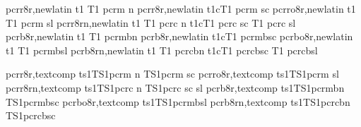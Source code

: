 

  {}
 {}
  {}
 {}

 {}
 {}

\installfonts
{}
  {pcrr8r,newlatin}  {t1} {T1} {pcr}{m} {n} {}
 {pcrr8r,newlatin}  {t1c}{T1} {pcr}{m} {sc}{}
 {pcrro8r,newlatin} {t1} {T1} {pcr}{m} {sl}{}
 {pcrr8rn,newlatin} {t1} {T1} {pcr}{c} {n} {}
 {t1c}{T1} {pcr}{c} {sc}{}
 {T1} {pcr}{c} {sl}{}
  {pcrb8r,newlatin}  {t1} {T1} {pcr}{mb}{n} {}
 {pcrb8r,newlatin}  {t1c}{T1} {pcr}{mb}{sc}{}
 {pcrbo8r,newlatin} {t1} {T1} {pcr}{mb}{sl}{}
 {pcrb8rn,newlatin} {t1} {T1} {pcr}{cb}{n} {}
 {t1c}{T1} {pcr}{cb}{sc}{}
 {T1} {pcr}{cb}{sl}{}
\endinstallfonts

\installfonts
{}
  {pcrr8r,textcomp}  {ts1}{TS1}{pcr}{m} {n} {}
                          {TS1}{pcr}{m} {sc}{}
 {pcrro8r,textcomp} {ts1}{TS1}{pcr}{m} {sl}{}
 {pcrr8rn,textcomp} {ts1}{TS1}{pcr}{c} {n} {}
                         {TS1}{pcr}{c} {sc}{}
 {sl}{}
  {pcrb8r,textcomp}  {ts1}{TS1}{pcr}{mb}{n} {}
                          {TS1}{pcr}{mb}{sc}{}
 {pcrbo8r,textcomp} {ts1}{TS1}{pcr}{mb}{sl}{}
 {pcrb8rn,textcomp} {ts1}{TS1}{pcr}{cb}{n} {}
                         {TS1}{pcr}{cb}{sc}{}
\endinstallfonts

\bye
